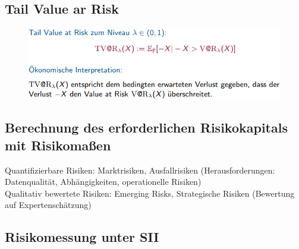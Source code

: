 \documentclass[12pt]{report}
\theoremstyle{dotless}
\theoremstyle{definition}
\begin{document}
\subsection{Tail Value ar Risk}
\begin{figure}[ht]
	\centering
	\includegraphics[width=0.9 \textwidth]{Bilder/TVaR.png}
\end{figure}

\subsection{Berechnung des erforderlichen Risikokapitals mit Risikomaßen}

Quantifizierbare Risiken: Marktrisiken, Ausfallrisiken (Herausforderungen: Datenqualität, Abhängigkeiten, operationelle Risiken) \\
Qualitativ bewertete Risiken: Emerging Risks, Strategische Risiken (Bewertung auf Expertenschätzung)

\subsection{Risikomessung unter SII}
\end{document}
